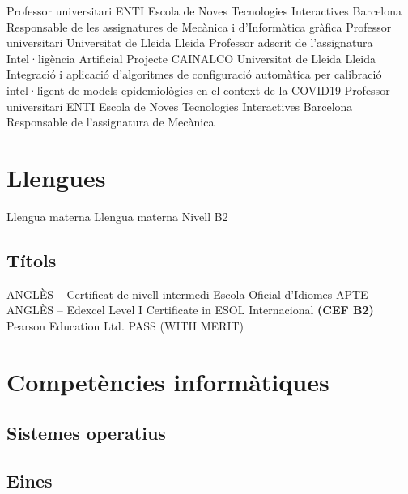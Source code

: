 \documentclass{cv}
\begin{document}
	{Professor universitari}
	{ENTI Escola de Noves Tecnologies Interactives}
	{Barcelona}
	{}
	{Responsable de les assignatures de Mecànica i d'Informàtica gràfica}
	{Professor universitari}
	{Universitat de Lleida}
	{Lleida}
	{}
	{Professor adscrit de l'assignatura Intel·ligència Artificial}
	{Projecte CAINALCO}
	{Universitat de Lleida}
	{Lleida}
	{}
	{Integració i aplicació d'algoritmes de configuració automàtica per
	calibració intel·ligent de models epidemiològics en el context de
	la COVID19}
	{Professor universitari}
	{ENTI Escola de Noves Tecnologies Interactives}
	{Barcelona}
	{}
	{Responsable de l'assignatura de Mecànica}

\section{Llengues}
	{Llengua materna}
	{}
	{Llengua materna}
	{}
	{Nivell B2}
	{}

\subsection{Títols}
	{ANGLÈS -- Certificat de nivell intermedi}
	{Escola Oficial d'Idiomes}
	{}
	{APTE}
	{}
	{ANGLÈS -- Edexcel Level I Certificate in ESOL Internacional
		\textbf{(CEF B2)}}
	{Pearson Education Ltd.}
	{}
	{PASS (WITH MERIT)}
	{}


\section{Competències informàtiques}
\subsection{Sistemes operatius}

\subsection{Eines}
\end{document}
